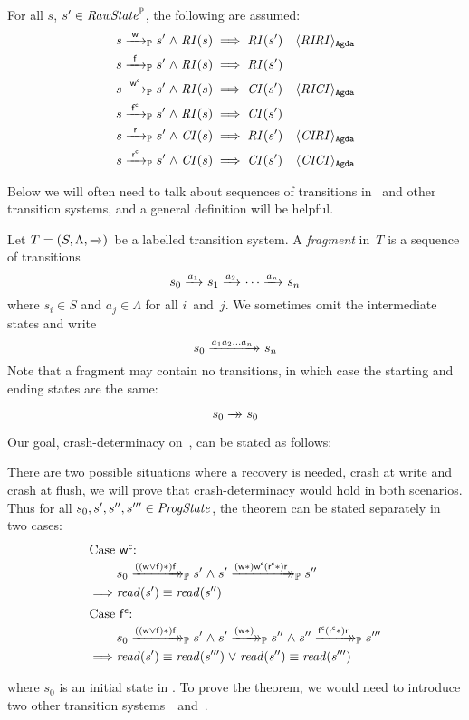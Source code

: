 \begin{assumption}
For all $s$, $s' \in \mathit{RawState}^{\mathbb P}$, the following are assumed:
\begin{align*}
s \ttP{\awa{\actw}{\actw }} s' \conj \i{RI}(s) &\implies \i{RI}(s') & \AgdaId{\id{RIRI}} \\
s \ttP{\awa{\actw}{\actf }} s' \conj \i{RI}(s) &\implies \i{RI}(s')\\
s \ttP{\awa{\actw}{\actwc}} s' \conj \i{RI}(s) &\implies \i{CI}(s') & \AgdaId{\id{RICI}} \\
s \ttP{\awa{\actw}{\actfc}} s' \conj \i{RI}(s) &\implies \i{CI}(s')\\
s \ttP{\awa{\actw}{\actr }} s' \conj \i{CI}(s) &\implies \i{RI}(s') & \AgdaId{\id{CIRI}} \\
s \ttP{\awa{\actw}{\actrc}} s' \conj \i{CI}(s) &\implies \i{CI}(s') & \AgdaId{\id{CICI}}
\end{align*}
\end{assumption}

Below we will often need to talk about sequences of transitions in \Prog\ and other transition systems, and a general definition will be helpful.
\begin{definition}\label{def:frag}
Let $T = (S, \Lambda, \xrightarrow{}_{})$~be a labelled transition system.
A \emph{fragment} in~$T$ is a sequence of transitions
$$ s_0 \xrightarrow{a_1}_{} s_1 \xrightarrow{a_2}_{} \cdots \xrightarrow{a_n}_{} s_n $$
where $s_i \in S$ and $a_j \in \Lambda$ for all $i$~and~$j$.
We sometimes omit the intermediate states and write
$$ s_0 \xrightarrow{a_1a_2\ldots a_n}\mathrel{\mkern-14mu}\rightarrow_{} s_n $$
Note that a fragment may contain no transitions, in which case the starting and ending states are the same: 
$$ s_0 \xrightarrow{\vphantom{a_n}}\mathrel{\mkern-14mu}\rightarrow_{} s_0 $$
\end{definition}

Our goal, crash-determinacy on~\Prog, can be stated as follows:
\begin{theorem} \label{theoremP}
	There are two possible situations where a recovery is needed, crash at write and crash at flush, we will prove that crash-determinacy would hold in both scenarios. Thus for all $s_0, s', s'', s''' \in \mathit{ProgState}$, the theorem can be stated separately in two cases:
\begin{align*}
	         \intertext{Case $\actwc$:}
	         &  s_0 \ttsP{\i{((\actw \lor \actf)\ast)} \actf} s' \conj s' \ttsP{\i{(\actw \ast)} \actwc \i{(\actrc\ast)} \actr} s'' \\
	\implies & \i{read(s')} \equiv \i{read(s'')} \\
	         \intertext{Case $\actfc$:}
	         & s_0 \ttsP{\i{((\actw \lor \actf)\ast)} \actf} s' \conj s' \ttsP{\i{(\actw \ast)}} s'' \conj s'' \ttsP{\actfc \i{(\actrc \ast)} \actr} s'''  \\
	\implies & \i{read(s')} \equiv \i{read(s''')} \disj \i{read(s'')} \equiv \i{read(s''')} 
\end{align*}
\end{theorem}
where $s_0$ is an initial state in \Prog.
To prove the theorem, we would need to introduce two other transition systems~\Spec~and~\ProgInv.
